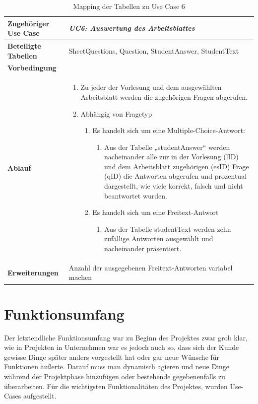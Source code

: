 \begin{table}
	\begin{tabular}{|p{3cm}|p{11.06cm}|}
	\hline
		\textbf{Zugehöriger Use Case}                 &     \emph{UC6: Auswertung des Arbeitsblattes} \prettyref{uc:UC6}    \\ \hline
		\textbf{Beteiligte Tabellen}      &    SheetQuestions, Question, StudentAnswer, StudentText     \\ \hline
		\textbf{Vorbedingung}              &         \\ \hline
		\textbf{Ablauf}              &   
			\begin{enumerate}
			  \item Zu jeder der Vorlesung und dem ausgewählten Arbeitsblatt werden die zugehörigen Fragen abgerufen.
			  \item Abhängig von Fragetyp
			  \begin{enumerate}
			    \item Es handelt sich um eine Multiple-Choice-Antwort:
				    \begin{enumerate}
					    \item Aus der Tabelle „studentAnswer“ werden nacheinander alle zur in der Vorlesung (lID) und dem Arbeitsblatt zugehörigen (esID) Frage (qID) die Antworten abgerufen und prozentual dargestellt, wie viele korrekt, falsch und nicht beantwortet wurden.
				 	\end{enumerate}
			    \item Es handelt sich um eine Freitext-Antwort
				    \begin{enumerate}
					   	\item Aus der Tabelle studentText werden zehn zufällige Antworten ausgewählt und nacheinander präsentiert.
				  	\end{enumerate}
			  \end{enumerate}
			\end{enumerate}
		\\ \hline
		\textbf{Erweiterungen}              &    Anzahl der ausgegebenen Freitext-Antworten variabel machen     \\ \hline
	\end{tabular}
	\caption{Mapping der Tabellen zu Use Case 6}
\end{table}\FloatBarrier

\section{Funktionsumfang}
Der letztendliche Funktionsumfang war zu Beginn des Projektes zwar grob klar, wie in Projekten in Unternehmen war es jedoch auch so, dass sich der Kunde gewisse Dinge später anders vorgestellt hat oder gar neue Wünsche für Funktionen äußerte.
Darauf muss man dynamisch agieren und neue Dinge während der Projektphase hinzufügen oder bestehende gegebenenfalls zu überarbeiten.
Für die wichtigsten Funktionalitäten des Projektes, wurden Use-Cases aufgestellt.

